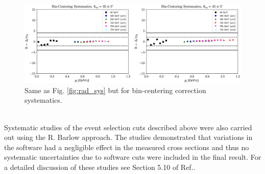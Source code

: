 \documentclass[aps, prl]{revtex4-2}  %
\begin{document}
\begin{figure}[!ht]
\includegraphics[scale=0.37]{plots/bc_sys.png}
\caption{Same as Fig. \ref{fig:rad_sys} but for bin-centering correction systematics.}
\label{fig:bc_sys}
\end{figure}\\
\indent Systematic studies of the event selection cuts described above were also carried out using the R. Barlow approach. The studies demonstrated that variations in the software had a negligible
effect in the measured cross sections and thus no systematic uncertainties due to software cuts were included in the final result. For a detailed discussion of these studies see Section 5.10 of Ref.\cite{cyero_phdthesis}.
\\\\

\end{document}
